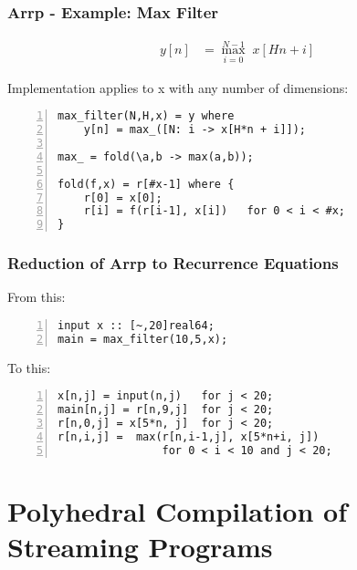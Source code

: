 \documentclass{beamer}
\begin{document}
\begin{frame}[fragile]
\frametitle{Arrp - Example: Max Filter}

\begin{align*}
y[n] &= \max_{i = 0}^{N-1} \; x[Hn+i]
\end{align*}

Implementation applies to x with any number of dimensions:

\vspace{1em}
\begin{Verbatim}[numbers=left]
max_filter(N,H,x) = y where
    y[n] = max_([N: i -> x[H*n + i]]);

max_ = fold(\a,b -> max(a,b));

fold(f,x) = r[#x-1] where {
    r[0] = x[0];
    r[i] = f(r[i-1], x[i])   for 0 < i < #x;
}
\end{Verbatim}

\end{frame}

\begin{frame}[fragile]
\frametitle{Reduction of Arrp to Recurrence Equations}

From this:

\begin{Verbatim}[numbers=left]
input x :: [~,20]real64;
main = max_filter(10,5,x);
\end{Verbatim}

To this:

\begin{Verbatim}[numbers=left]
x[n,j] = input(n,j)   for j < 20;
main[n,j] = r[n,9,j]  for j < 20;
r[n,0,j] = x[5*n, j]  for j < 20;
r[n,i,j] =  max(r[n,i-1,j], x[5*n+i, j])
                for 0 < i < 10 and j < 20;
\end{Verbatim}

\end{frame}


\section{Polyhedral Compilation of Streaming Programs}
\end{document}
